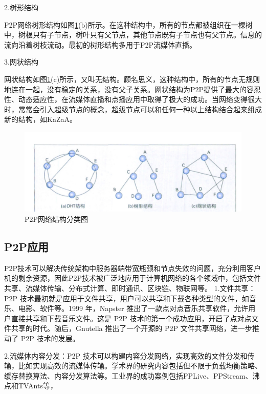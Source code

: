 \documentclass[a4paper,twoside]{scrbook}
\begin{document}
\begin{CJK}{UTF8}{gbsn}
2.树形结构

P2P网络树形结构如图\ref{fig:P2P network architecture}(b)所示。在这种结构中，所有的节点都被组织在一棵树中，树根只有子节点，树叶只有父节点，其他节点既有子节点也有父节点。信息的流向沿着树枝流动。最初的树形结构多用于P2P流媒体直播。

3.网状结构

网状结构如图\ref{fig:P2P network architecture}(c)所示，又叫无结构。顾名思义，这种结构中，所有的节点无规则地连在一起，没有稳定的关系，没有父子关系。网状结构为P2P提供了最大的容忍性、动态适应性，在流媒体直播和点播应用中取得了极大的成功。当网络变得很大时，常常会引入超级节点的概念，超级节点可以和任何一种以上结构结合起来组成新的结构，如KaZaA\cite{leibowitz2003deconstructing}。

\begin{figure}[!htbp]
\centering
\includegraphics[width=1\textwidth]{Figures/P2P network architecture.png}
\caption{P2P网络结构分类图} 
\label{fig:P2P network architecture}
\end{figure}

\subsection{P2P应用}
P2P技术可以解决传统架构中服务器端带宽瓶颈和节点失效的问题，充分利用客户机的剩余资源，因此P2P技术被广泛地应用于计算机网络的各个领域中，包括文件共享、流媒体传输、分布式计算、即时通讯、区块链、物联网等。
1.文件共享：P2P 技术最初就是应用于文件共享，用户可以共享和下载各种类型的文件，如音乐、电影、软件等。1999 年，Napster 推出了一款点对点音乐共享软件，允许用户直接共享和下载音乐文件。这是 P2P 技术的第一个成功应用，开启了点对点文件共享的时代。随后，Gnutella 推出了一个开源的 P2P 文件共享网络，进一步推动了 P2P 技术的发展。

2.流媒体内容分发：P2P 技术可以构建内容分发网络，实现高效的文件分发和传输，比如实现高效的流媒体传输。学术界的研究内容包括但不限于负载均衡策略、缓存替换算法、内容分发算法等。工业界的成功案例包括PPLive、PPStream、沸点和TVAnts等，


\end{CJK}
\end{document}

